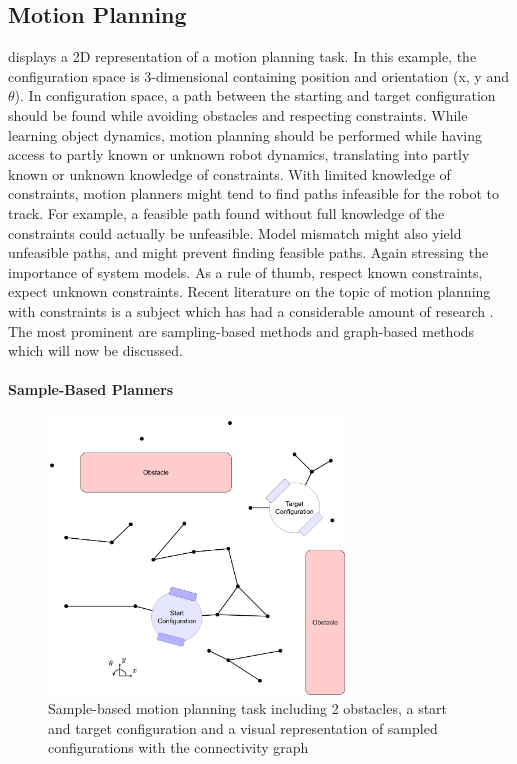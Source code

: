  
\subsection{Motion Planning}
\label{subsection: motion_planning}
 displays a 2D representation of a motion planning task. In this example, the configuration space is 3-dimensional containing position and orientation (x, y and $\theta$). In configuration space, a path between the starting and target configuration should be found while avoiding obstacles and respecting constraints. While learning object dynamics, motion planning should be performed while having access to partly known or unknown robot dynamics, translating into partly known or unknown knowledge of constraints. With limited knowledge of constraints, motion planners might tend to find paths infeasible for the robot to track. For example, a feasible path found without full knowledge of the constraints could actually be unfeasible. Model mismatch might also yield unfeasible paths, and might prevent finding feasible paths. Again stressing the importance of system models. As a rule of thumb, respect known constraints, expect unknown constraints. Recent literature on the topic of motion planning with constraints is a subject which has had a considerable amount of research \cite{kingston_sampling-based_2018,lavalle_planning_2006}. The most prominent are sampling-based methods and graph-based methods which will now be discussed. 

\paragraph{Sample-Based Planners}

\begin{figure}[h!]
    \centering
    \includegraphics[width=0.7\textwidth]{figures/motion_planning_robot.png}
    \caption{Sample-based motion planning task including 2 obstacles, a start and target configuration and a visual representation of sampled configurations with the connectivity graph}
    \label{figure: single_body_motion_task}
\end{figure}

